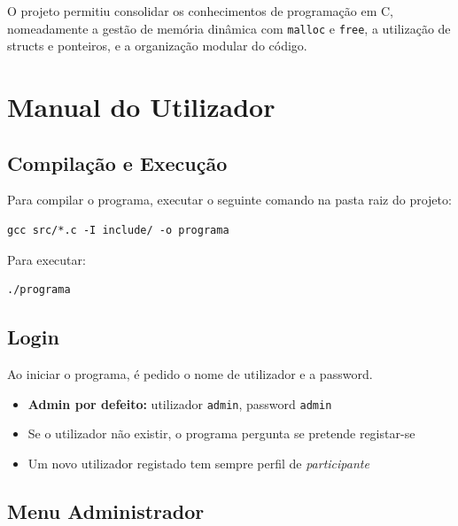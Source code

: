 \documentclass[12pt,a4paper]{article}
\begin{document}
O projeto permitiu consolidar os conhecimentos de programação em C, nomeadamente a gestão de memória dinâmica com \texttt{malloc} e \texttt{free}, a utilização de structs e ponteiros, e a organização modular do código.

\appendix
\section{Manual do Utilizador}

\subsection{Compilação e Execução}

Para compilar o programa, executar o seguinte comando na pasta raiz do projeto:

\begin{verbatim}
gcc src/*.c -I include/ -o programa
\end{verbatim}

Para executar:

\begin{verbatim}
./programa
\end{verbatim}

\subsection{Login}

Ao iniciar o programa, é pedido o nome de utilizador e a password.

\begin{itemize}
  \item \textbf{Admin por defeito:} utilizador \texttt{admin}, password \texttt{admin}
  \item Se o utilizador não existir, o programa pergunta se pretende registar-se
  \item Um novo utilizador registado tem sempre perfil de \textit{participante}
\end{itemize}

\subsection{Menu Administrador}
\end{document}

